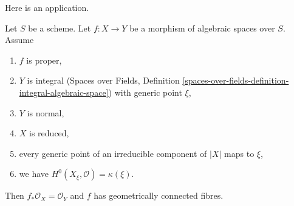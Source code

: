 \noindent
Here is an application.

\begin{lemma}
\label{lemma-geometrically-connected-fibres-towards-normal}
Let $S$ be a scheme. Let $f : X \to Y$ be a morphism of algebraic
spaces over $S$. Assume
\begin{enumerate}
\item $f$ is proper,
\item $Y$ is integral (Spaces over Fields, Definition
\ref{spaces-over-fields-definition-integral-algebraic-space})
with generic point $\xi$,
\item $Y$ is normal,
\item $X$ is reduced,
\item every generic point of an irreducible component of $|X|$ maps to $\xi$,
\item we have $H^0(X_\xi, \mathcal{O}) = \kappa(\xi)$.
\end{enumerate}
Then $f_*\mathcal{O}_X = \mathcal{O}_Y$ and $f$
has geometrically connected fibres.
\end{lemma}

